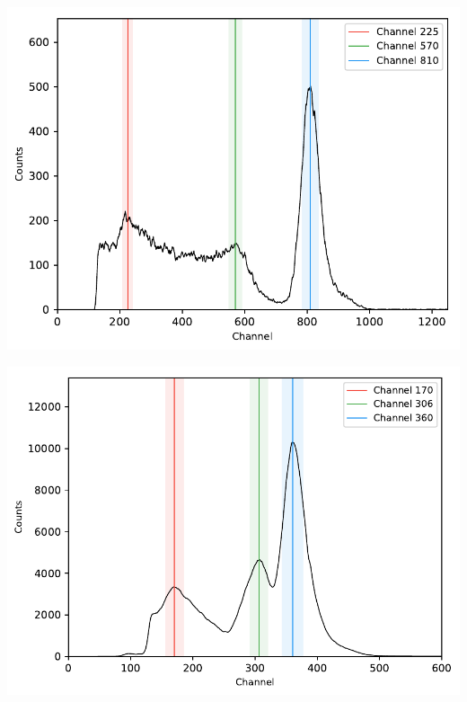 \begin{multicols}{2}
\begin{center}
\begin{adjustbox}{max width=\linewidth, keepaspectratio}
        \end{adjustbox}
        \label{fig:Spectrum137Cs}
    \end{center}
\endminipage
%
\vspace{10mm}
%
\minipage{\linewidth}
    \begin{center}
        \captionsetup{type=figure}
        \begin{adjustbox}{max width=\linewidth, keepaspectratio}
            \includegraphics[]{pdf/54Mn}
        \end{adjustbox}
        \label{fig:Spectrum54Mn}
    \end{center}
\endminipage
%
\vspace{10mm}
%
\minipage{\linewidth}
    \begin{center}
        \captionsetup{type=figure}
        \begin{adjustbox}{max width=\linewidth, keepaspectratio}
            \includegraphics[]{pdf/133Ba}

\end{adjustbox}
\end{center}
\end{multicols}
